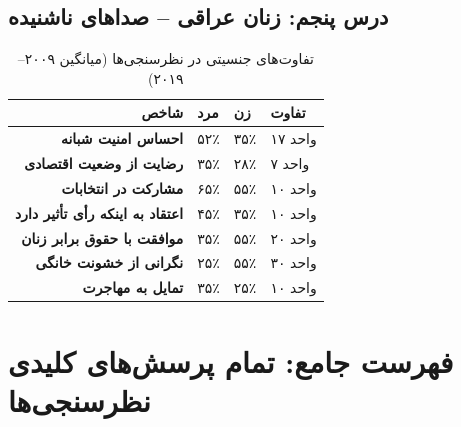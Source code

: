 
\subsection{درس پنجم: زنان عراقی -- صداهای ناشنیده}

\begin{table}[H]
\centering
\caption{تفاوت‌های جنسیتی در نظرسنجی‌ها (میانگین ۲۰۰۹--۲۰۱۹)}
\label{tab:gender-gap}
\begin{tabularx}{\textwidth}{>{\bfseries\small}r >{\centering\arraybackslash\small}X >{\centering\arraybackslash\small}X >{\centering\arraybackslash\small}X}
\toprule
\textbf{شاخص} & \textbf{مرد} & \textbf{زن} & \textbf{تفاوت} \\
\midrule
احساس امنیت شبانه & ۵۲٪ & ۳۵٪ & ۱۷ واحد \\
رضایت از وضعیت اقتصادی & ۳۵٪ & ۲۸٪ & ۷ واحد \\
مشارکت در انتخابات & ۶۵٪ & ۵۵٪ & ۱۰ واحد \\
اعتقاد به اینکه رأی تأثیر دارد & ۴۵٪ & ۳۵٪ & ۱۰ واحد \\
موافقت با حقوق برابر زنان & ۳۵٪ & ۵۵٪ & ۲۰ واحد \\
نگرانی از خشونت خانگی & ۲۵٪ & ۵۵٪ & ۳۰ واحد \\
تمایل به مهاجرت & ۳۵٪ & ۲۵٪ & ۱۰ واحد \\
\bottomrule
\end{tabularx}
\end{table}


\section{فهرست جامع: تمام پرسش‌های کلیدی نظرسنجی‌ها}

